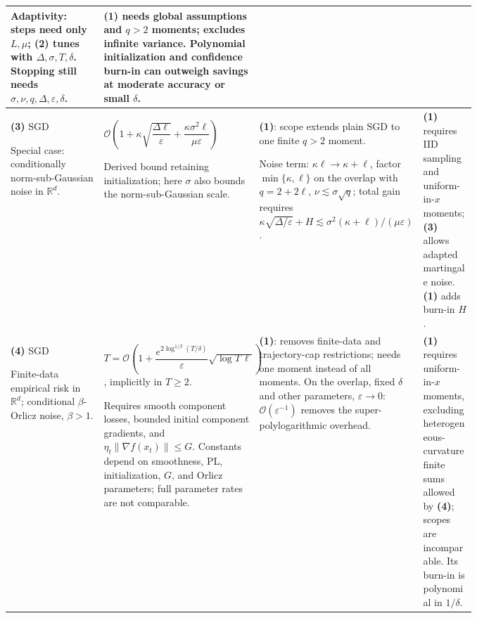 \begin{table}[tp]
\begin{threeparttable}
\begin{tabularx}{\linewidth}{@{}>{\raggedright\arraybackslash}p{0.20\linewidth}>{\raggedright\arraybackslash}p{0.32\linewidth}>{\raggedright\arraybackslash}p{0.25\linewidth}>{\raggedright\arraybackslash}X@{}}
\par Adaptivity: steps need only $L,\mu$; \textbf{(2)} tunes with $\Delta,\sigma,T,\delta$. Stopping still needs $\sigma,\nu,q,\Delta,\varepsilon,\delta$.
& \textbf{(1)} needs global assumptions and $q>2$ moments; excludes infinite variance. Polynomial initialization and confidence burn-in can outweigh savings at moderate accuracy or small $\delta$.
\\
\midrule
\textbf{(3)} SGD \citep[Thm.~8]{htplMadden2024}
\par Special case: conditionally norm-sub-Gaussian noise in $\mathbb R^d$.
& $\mathcal{O}\!\left(1+\kappa\sqrt{\dfrac{\Delta\ell}{\varepsilon}}+\dfrac{\kappa\sigma^2\ell}{\mu\varepsilon}\right)$
\par Derived bound retaining initialization; here $\sigma$ also bounds the norm-sub-Gaussian scale.
& \textbf{(1)}: scope extends plain SGD to one finite $q>2$ moment.
\par Noise term: $\kappa\ell\to\kappa+\ell$, factor $\min\{\kappa,\ell\}$ on the overlap with $q=2+2\ell$, $\nu\lesssim\sigma\sqrt q$; total gain requires $\kappa\sqrt{\Delta/\varepsilon}+H\lesssim\sigma^2(\kappa+\ell)/(\mu\varepsilon)$.
& \textbf{(1)} requires IID sampling and uniform-in-$x$ moments; \textbf{(3)} allows adapted martingale noise. \textbf{(1)} adds burn-in $H$.
\\
\midrule
\textbf{(4)} SGD \citep[Thm.~3.7]{htplTong2026v1}
\par Finite-data empirical risk in $\mathbb R^d$; conditional $\beta$-Orlicz noise, $\beta>1$.
& $T=\mathcal{O}\!\left(1+\dfrac{e^{2\log^{1/\beta}(T/\delta)}}{\varepsilon}\sqrt{\log T\,\ell}\right)$, implicitly in $T\geq2$.
\par Requires smooth component losses, bounded initial component gradients, and $\eta_t\|\nabla f(x_t)\|\leq G$. Constants depend on smoothness, PL, initialization, $G$, and Orlicz parameters; full parameter rates are not comparable.
& \textbf{(1)}: removes finite-data and trajectory-cap restrictions; needs one moment instead of all moments. On the overlap, fixed $\delta$ and other parameters, $\varepsilon\to0$: $\mathcal{O}(\varepsilon^{-1})$ removes the super-polylogarithmic overhead.
& \textbf{(1)} requires uniform-in-$x$ moments, excluding heterogeneous-curvature finite sums allowed by \textbf{(4)}; scopes are incomparable. Its burn-in is polynomial in $1/\delta$.
\\
\bottomrule
\end{tabularx}
\begin{tablenotes}[flushleft]\footnotesize

\end{tablenotes}
\end{threeparttable}
\end{table}
